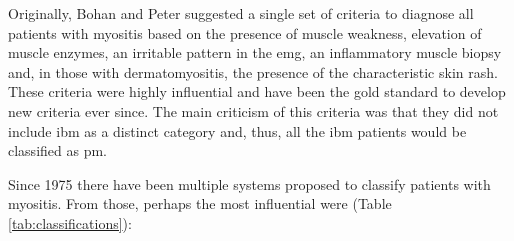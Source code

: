 Originally, Bohan and Peter suggested a single set of criteria to diagnose all patients with myositis based on the presence of muscle weakness, elevation of muscle enzymes, an irritable pattern in the \gls{emg}, an inflammatory muscle biopsy and, in those with dermatomyositis, the presence of the characteristic skin rash.\cite{Bohan1975} These criteria were highly influential and have been the gold standard to develop new criteria ever since. The main criticism of this criteria was that they did not include \gls{ibm} as a distinct category and, thus, all the \gls{ibm} patients would be classified as \gls{pm}.

Since 1975 there have been multiple systems proposed to classify patients with myositis. From those, perhaps the most influential were (Table \ref{tab:classifications}):

